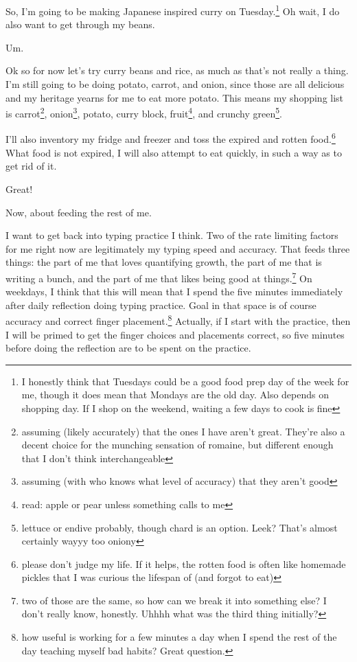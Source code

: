 \documentclass[12pt]{article}[titlepage]
\renewcommand{\,}{\textsuperscript{,}}
\begin{document}
So, I'm going to be making Japanese inspired curry on Tuesday.\footnote{I honestly think that Tuesdays could be a good food prep day of the week for me, though it does mean that Mondays are the old day. Also depends on shopping day. If I shop on the weekend, waiting a few days to cook is fine}  
Oh wait, I do also want to get through my beans.

Um.

Ok so for now let's try curry beans and rice, as much as that's not really a thing.  
I'm still going to be doing potato, carrot, and onion, since those are all delicious and my heritage yearns for me to eat more potato.  
This means my shopping list is carrot\footnote{assuming (likely accurately) that the ones I have aren't great. They're also a decent choice for the munching sensation of romaine, but different enough that I don't think interchangeable}, onion\footnote{assuming (with who knows what level of accuracy) that they aren't good}, potato, curry block, fruit\footnote{read: apple or pear unless something calls to me}, and crunchy green\footnote{lettuce or endive probably, though chard is an option. Leek? That's almost certainly wayyy too oniony}.

I'll also inventory my fridge and freezer and toss the expired and rotten food.\footnote{please don't judge my life. If it helps, the rotten food is often like homemade pickles that I was curious the lifespan of (and forgot to eat)}  
What food is not expired, I will also attempt to eat quickly, in such a way as to get rid of it.

Great!

Now, about feeding the rest of me.

I want to get back into typing practice I think.  
Two of the rate limiting factors for me right now are legitimately my typing speed and accuracy.  
That feeds three things: the part of me that loves quantifying growth, the part of me that is writing a bunch, and the part of me that likes being good at things.\footnote{two of those are the same, so how can we break it into something else? I don't really know, honestly. Uhhhh what was the third thing initially?}  
On weekdays, I think that this will mean that I spend the five minutes immediately after daily reflection doing typing practice.  
Goal in that space is of course accuracy and correct finger placement.\footnote{how useful is working for a few minutes a day when I spend the rest of the day teaching myself bad habits? Great question.}  
Actually, if I start with the practice, then I will be primed to get the finger choices and placements correct, so five minutes before doing the reflection are to be spent on the practice.
\end{document}
